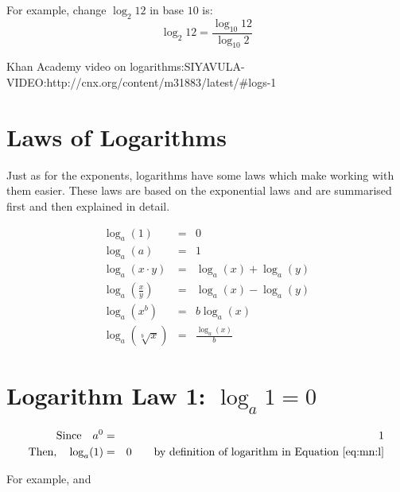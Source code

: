For example, change $\log_{2}12$ in base $10$ is:
\begin{equation*}
\log_{2}12=\frac{\log_{10}12}{\log_{10}2}
\end{equation*}

Khan Academy video on logarithms:SIYAVULA-VIDEO:http://cnx.org/content/m31883/latest/#logs-1
\section{Laws of Logarithms}
Just as for the exponents, logarithms have some laws which make working with them easier. These laws are based on the exponential laws and are summarised first and then explained in detail.

\begin{eqnarray}
\label{eq:mn:l:law1}
\log_{a}(1)&=&0\\
\label{eq:mn:l:law2}
\log_{a}(a)&=&1 \\
\label{eq:mn:l:law3}
\log_{a}(x\cdot y) &=& \log_{a}(x) + \log_{a}(y)\\
\label{eq:mn:l:law4}
\log_{a}\left(\frac{x}{y}\right) &=& \log_{a}(x) - \log_{a}(y) \\
\label{eq:mn:l:law5}
\log_{a}(x^b) &=& b \log_{a}(x)\\
\label{eq:mn:l:law6}
\log_{a}\left(\sqrt[b]{x}\right) &=& \frac{\log_{a}(x)}{b}
\end{eqnarray}

\section{Logarithm Law 1: $\log_{a}1 = 0$}
\begin{eqnarray*}
\mbox{Since}\quad a^0&=&1\\
\mbox{Then,}\quad \log_{a}(1)&=&0\qquad \mbox{by definition of logarithm in Equation~\ref{eq:mn:l}}
\end{eqnarray*}

For example,
and

